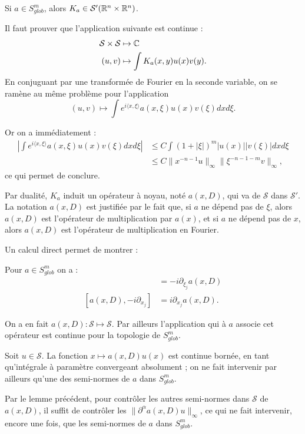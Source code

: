 \begin{prop}
	Si $a \in S^m_{glob}$, alors $K_a \in \mathcal{S}'(\mathbb{R}^n\times \mathbb{R}^n)$.
\end{prop}
\begin{preuve}
	Il faut prouver que l'application suivante est continue :
	\begin{align*}
		\mathcal{S}\times \mathcal{S} &\mapsto \mathbb{C}\\
		(u,v) &\mapsto \int K_a(x,y)u(x)v(y).
	\end{align*}
	En conjuguant par une transformée de Fourier en la seconde variable, on se ramène au même problème pour l'application
	\begin{equation*}
		(u,v) \mapsto \int e^{i\langle x,\xi \rangle}a(x,\xi)u(x)v(\xi)dxd\xi.
	\end{equation*}
	
	Or on a immédiatement :
	\begin{align*}
		\left|\int e^{i\langle x,\xi \rangle}a(x,\xi)u(x)v(\xi)dxd\xi\right| &\leq C\int(1+|\xi|)^m|u(x)||v(\xi)|dxd\xi\\
		&\leq C\|x^{-n-1}u\|_{\infty}\|\xi^{-n-1-m}v\|_{\infty},
	\end{align*}
	ce qui permet de conclure.
\end{preuve}
Par dualité, $K_a$ induit un opérateur à noyau, noté $a(x,D)$, qui va de $\mathcal{S}$ dans $\mathcal{S'}$. La notation $a(x,D)$ est justifiée par le fait que, si $a$ ne dépend pas de $\xi$, alors $a(x,D)$ est l'opérateur de multiplication par $a(x)$, et si $a$ ne dépend pas de $x$, alors $a(x,D)$ est l'opérateur de multiplication en Fourier.

Un calcul direct permet de montrer :
\begin{lem}
	Pour $a \in S^m_{glob}$ on a :
	\begin{align*}
		[a(x,D),x_j] &= -i\partial_{\xi_j}a(x,D)\\
		[a(x,D),-i\partial_{x_j}] &= i \partial_{x_j}a(x,D).
	\end{align*}
\end{lem}

\begin{corr}
	On a en fait $a(x,D) : \mathcal{S} \mapsto \mathcal{S}$. Par ailleurs l'application qui à $a$ associe cet opérateur est continue pour la topologie de $S^m_{glob}$.
\end{corr}
\begin{preuve}
	Soit $u \in \mathcal{S}$. La fonction $x \mapsto a(x,D)u(x)$ est continue bornée, en tant qu'intégrale à paramètre convergeant absolument ; on ne fait intervenir par ailleurs qu'une des semi-normes de $a$ dans $S^m_{glob}$.
	
	Par le lemme précédent, pour contrôler les autres semi-normes dans $\mathcal{S}$ de $a(x,D)$, il suffit de contrôler les $\|\partial^{\alpha}a(x,D)u\|_{\infty}$, ce qui ne fait intervenir, encore une fois, que les semi-normes de $a$ dans $S^m_{glob}$.
\end{preuve}

